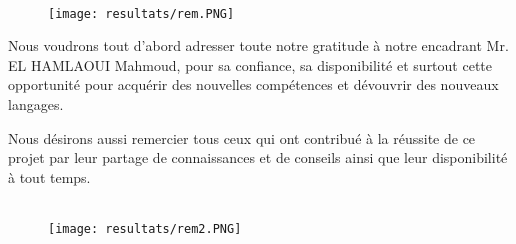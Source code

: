 \renewcommand{\abstractnamefont}{\normalfont\LARGE\bfseries}


\begin{figure}[!h]

\begin{center}
\\ [6 cm]
\texttt{[image: resultats/rem.PNG]}
\end{center}
\end{figure}

\hskip7mm

\LARGE

\begin{spacing}{1.3}

Nous voudrons tout d’abord adresser toute notre gratitude à notre encadrant Mr. EL HAMLAOUI Mahmoud, pour sa confiance, sa disponibilité et surtout cette opportunité pour acquérir des nouvelles compétences et dévouvrir des nouveaux langages.

Nous désirons aussi remercier tous ceux qui ont contribué à la réussite de ce projet par leur partage de connaissances et de conseils ainsi que leur disponibilité à tout temps.



\end{spacing}

\begin{figure}[!h]

\begin{center}
\\ [2 cm]
\texttt{[image: resultats/rem2.PNG]}
\end{center}
\end{figure}
